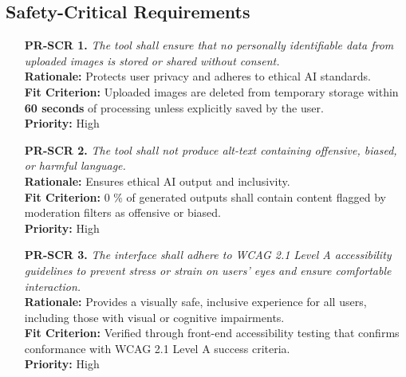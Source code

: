 \documentclass[12pt]{article}
\begin{document}
\subsection{Safety-Critical Requirements}
\begin{itemize}
  \item[\textbf{PR-SCR 1.}] \textit{The tool shall ensure that no
      personally identifiable data from uploaded images is stored or
    shared without consent.}\\
    \textbf{Rationale:} Protects user privacy and adheres to ethical
    AI standards.\\
    \textbf{Fit Criterion:} Uploaded images are deleted from
    temporary storage within \textbf{60 seconds} of processing unless
    explicitly saved by the user.\\
    \textbf{Priority:} High

  \item[\textbf{PR-SCR 2.}] \textit{The tool shall not produce
    alt-text containing offensive, biased, or harmful language.}\\
    \textbf{Rationale:} Ensures ethical AI output and inclusivity.\\
    \textbf{Fit Criterion:} 0 \% of generated outputs shall contain
    content flagged by moderation filters as offensive or biased.\\
    \textbf{Priority:} High

  \item[\textbf{PR-SCR 3.}] \textit{The interface shall adhere to
      WCAG 2.1 Level A accessibility guidelines to prevent stress or
    strain on users’ eyes and ensure comfortable interaction.}\\
    \textbf{Rationale:} Provides a visually safe, inclusive
    experience for all users, including those with visual or
    cognitive impairments.\\
    \textbf{Fit Criterion:} Verified through front-end accessibility
    testing that confirms conformance with WCAG 2.1 Level A success criteria.\\
    \textbf{Priority:} High
\end{itemize}
\end{document}
